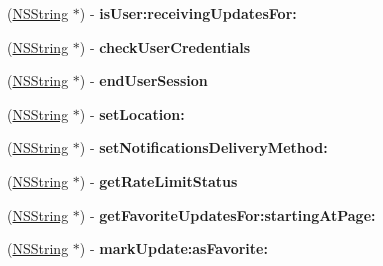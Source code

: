 \begin{DoxyCompactItemize}
\item 
\hypertarget{interface_m_g_twitter_engine_a14bc9ae997631519263d6faac1f7f24b}{
(\hyperlink{class_n_s_string}{\-N\-S\-String} $\ast$) -\/ {\bfseries is\-User\-:receiving\-Updates\-For\-:}}
\label{interface_m_g_twitter_engine_a14bc9ae997631519263d6faac1f7f24b}

\item 
\hypertarget{interface_m_g_twitter_engine_a35842c057f70b8a85e85e66f5cdde346}{
(\hyperlink{class_n_s_string}{\-N\-S\-String} $\ast$) -\/ {\bfseries check\-User\-Credentials}}
\label{interface_m_g_twitter_engine_a35842c057f70b8a85e85e66f5cdde346}

\item 
\hypertarget{interface_m_g_twitter_engine_acb2e2bd41aafada909bfabd60c9e61de}{
(\hyperlink{class_n_s_string}{\-N\-S\-String} $\ast$) -\/ {\bfseries end\-User\-Session}}
\label{interface_m_g_twitter_engine_acb2e2bd41aafada909bfabd60c9e61de}

\item 
\hypertarget{interface_m_g_twitter_engine_a1e3a796f8dcf1d305cfd005eb509b49a}{
(\hyperlink{class_n_s_string}{\-N\-S\-String} $\ast$) -\/ {\bfseries set\-Location\-:}}
\label{interface_m_g_twitter_engine_a1e3a796f8dcf1d305cfd005eb509b49a}

\item 
\hypertarget{interface_m_g_twitter_engine_a8c669251e204ed7eaea3b0e7cafcd926}{
(\hyperlink{class_n_s_string}{\-N\-S\-String} $\ast$) -\/ {\bfseries set\-Notifications\-Delivery\-Method\-:}}
\label{interface_m_g_twitter_engine_a8c669251e204ed7eaea3b0e7cafcd926}

\item 
\hypertarget{interface_m_g_twitter_engine_add8d28f4ced666f4019774fe42bb8a4d}{
(\hyperlink{class_n_s_string}{\-N\-S\-String} $\ast$) -\/ {\bfseries get\-Rate\-Limit\-Status}}
\label{interface_m_g_twitter_engine_add8d28f4ced666f4019774fe42bb8a4d}

\item 
\hypertarget{interface_m_g_twitter_engine_a9ed6e1d90d6005ae8bed71d8a6998ebe}{
(\hyperlink{class_n_s_string}{\-N\-S\-String} $\ast$) -\/ {\bfseries get\-Favorite\-Updates\-For\-:starting\-At\-Page\-:}}
\label{interface_m_g_twitter_engine_a9ed6e1d90d6005ae8bed71d8a6998ebe}

\item 
\hypertarget{interface_m_g_twitter_engine_af22def121aeacf357915b6da4b171369}{
(\hyperlink{class_n_s_string}{\-N\-S\-String} $\ast$) -\/ {\bfseries mark\-Update\-:as\-Favorite\-:}}
\label{interface_m_g_twitter_engine_af22def121aeacf357915b6da4b171369}


\end{DoxyCompactItemize}
